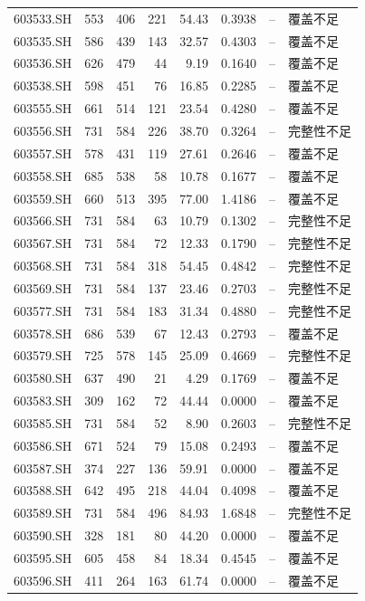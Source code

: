\documentclass[10pt,a4paper]{article}
\begin{document}
\begin{longtable}{lrrr r r r l}
603533.SH & 553 & 406 & 221 & 54.43 & 0.3938 & -- & 覆盖不足\\
603535.SH & 586 & 439 & 143 & 32.57 & 0.4303 & -- & 覆盖不足\\
603536.SH & 626 & 479 & 44 & 9.19 & 0.1640 & -- & 覆盖不足\\
603538.SH & 598 & 451 & 76 & 16.85 & 0.2285 & -- & 覆盖不足\\
603555.SH & 661 & 514 & 121 & 23.54 & 0.4280 & -- & 覆盖不足\\
603556.SH & 731 & 584 & 226 & 38.70 & 0.3264 & -- & 完整性不足\\
603557.SH & 578 & 431 & 119 & 27.61 & 0.2646 & -- & 覆盖不足\\
603558.SH & 685 & 538 & 58 & 10.78 & 0.1677 & -- & 覆盖不足\\
603559.SH & 660 & 513 & 395 & 77.00 & 1.4186 & -- & 覆盖不足\\
603566.SH & 731 & 584 & 63 & 10.79 & 0.1302 & -- & 完整性不足\\
603567.SH & 731 & 584 & 72 & 12.33 & 0.1790 & -- & 完整性不足\\
603568.SH & 731 & 584 & 318 & 54.45 & 0.4842 & -- & 完整性不足\\
603569.SH & 731 & 584 & 137 & 23.46 & 0.2703 & -- & 完整性不足\\
603577.SH & 731 & 584 & 183 & 31.34 & 0.4880 & -- & 完整性不足\\
603578.SH & 686 & 539 & 67 & 12.43 & 0.2793 & -- & 覆盖不足\\
603579.SH & 725 & 578 & 145 & 25.09 & 0.4669 & -- & 完整性不足\\
603580.SH & 637 & 490 & 21 & 4.29 & 0.1769 & -- & 覆盖不足\\
603583.SH & 309 & 162 & 72 & 44.44 & 0.0000 & -- & 覆盖不足\\
603585.SH & 731 & 584 & 52 & 8.90 & 0.2603 & -- & 完整性不足\\
603586.SH & 671 & 524 & 79 & 15.08 & 0.2493 & -- & 覆盖不足\\
603587.SH & 374 & 227 & 136 & 59.91 & 0.0000 & -- & 覆盖不足\\
603588.SH & 642 & 495 & 218 & 44.04 & 0.4098 & -- & 覆盖不足\\
603589.SH & 731 & 584 & 496 & 84.93 & 1.6848 & -- & 完整性不足\\
603590.SH & 328 & 181 & 80 & 44.20 & 0.0000 & -- & 覆盖不足\\
603595.SH & 605 & 458 & 84 & 18.34 & 0.4545 & -- & 覆盖不足\\
603596.SH & 411 & 264 & 163 & 61.74 & 0.0000 & -- & 覆盖不足\\

\end{longtable}
\end{document}
